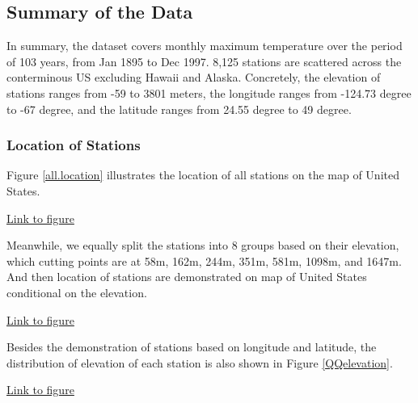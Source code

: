 \subsection{Summary of the Data}
\label{sec:summaryData}

In summary, the dataset covers monthly maximum temperature over the period of 103
years, from Jan 1895 to Dec 1997. 8,125 stations are scattered across the 
conterminous US excluding Hawaii and Alaska. Concretely, the elevation of 
stations ranges from -59 to 3801 meters, the longitude ranges from -124.73 degree
to -67 degree, and the latitude ranges from 24.55 degree to 49 degree. 

\subsubsection{Location of Stations}

Figure \href{../plots/allstationsone.pdf}{\ref*{all.location}} illustrates the
location of all stations on the map of United States.

\begin{framed}
\begin{center}
  \href{../plots/allstationsone.pdf}{Link to figure}
  \label{all.location}
\end{center}
\end{framed}

Meanwhile, we equally split the stations into 8 groups based on their elevation, 
which cutting points are at 58m, 162m, 244m, 351m, 581m, 1098m, and 1647m. And 
then location of stations are demonstrated on map of United States conditional on 
the elevation.

\begin{framed}
\begin{center}
  \href{../plots/allstations.pdf}{Link to figure}
  \label{all.location.multi}
\end{center}
\end{framed}

Besides the demonstration of stations based on longitude and latitude, the 
distribution of elevation of each station is also shown in Figure 
\href{../plots/QQelevation.pdf}{\ref*{QQelevation}}.

\begin{framed}
\begin{center}
  \href{../plots/QQelevation.pdf}{Link to figure}
  \label{QQelevation}
\end{center}
\end{framed}

